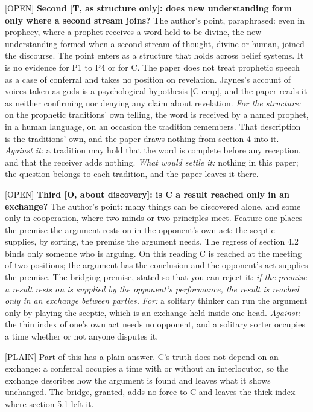 \documentclass[11pt]{article}
\newcommand{\register}[1]{{\ttfamily\small #1}}
\begin{document}
\register{[OPEN]} \textbf{Second [T, as structure only]: does new understanding form only where a second stream joins?} The author's point, paraphrased: even in prophecy, where a prophet receives a word held to be divine, the new understanding formed when a second stream of thought, divine or human, joined the discourse. The point enters as a structure that holds across belief systems. It is no evidence for P1 to P4 or for C. The paper does not treat prophetic speech as a case of conferral and takes no position on revelation. Jaynes's account of voices taken as gods is a psychological hypothesis [C-emp], and the paper reads it as neither confirming nor denying any claim about revelation. \emph{For the structure:} on the prophetic traditions' own telling, the word is received by a named prophet, in a human language, on an occasion the tradition remembers. That description is the traditions' own, and the paper draws nothing from section 4 into it. \emph{Against it:} a tradition may hold that the word is complete before any reception, and that the receiver adds nothing. \emph{What would settle it:} nothing in this paper; the question belongs to each tradition, and the paper leaves it there.

\register{[OPEN]} \textbf{Third [O, about discovery]: is C a result reached only in an exchange?} The author's point: many things can be discovered alone, and some only in cooperation, where two minds or two principles meet. Feature one places the premise the argument rests on in the opponent's own act: the sceptic supplies, by sorting, the premise the argument needs. The regress of section 4.2 binds only someone who is arguing. On this reading C is reached at the meeting of two positions; the argument has the conclusion and the opponent's act supplies the premise. The bridging premise, stated so that you can reject it: \emph{if the premise a result rests on is supplied by the opponent's performance, the result is reached only in an exchange between parties.} \emph{For:} a solitary thinker can run the argument only by playing the sceptic, which is an exchange held inside one head. \emph{Against:} the thin index of one's own act needs no opponent, and a solitary sorter occupies a time whether or not anyone disputes it.

\register{[PLAIN]} Part of this has a plain answer. C's truth does not depend on an exchange: a conferral occupies a time with or without an interlocutor, so the exchange describes how the argument is found and leaves what it shows unchanged. The bridge, granted, adds no force to C and leaves the thick index where section 5.1 left it.
\end{document}
